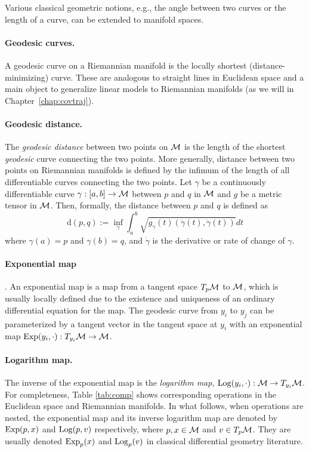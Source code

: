 Various classical geometric notions, e.g., the angle between two curves 
or the length of a curve, can be extended to manifold spaces.

\paragraph{Geodesic curves.} A geodesic curve on a Riemannian manifold is the locally shortest (distance-minimizing) curve.
These are analogous to straight lines in Euclidean space 
and a main object to generalize linear models to Riemannian manifolds (as we will in Chapter~\ref{chap:covtraj}).

\paragraph{Geodesic distance.} The \textit{geodesic distance}
between two points on $\mathcal{M}$ is the length of the shortest {\em geodesic} curve connecting the two points. More generally, distance between two points on Riemannian manifolds is defined by the infimum of the length of all differentiable curves connecting the two points. Let $\gamma$ be a continuously differentiable curve $\gamma:[a,b] \rightarrow \mathcal{M}$ between $p$ and $q$ in $\mathcal{M}$ and $g$ be a metric tensor in $\mathcal{M}$.
Then, formally, the distance between $p$ and $q$ is defined as
\begin{equation}
\text{d}(p,q) := \inf_\gamma \int_a^b \sqrt{g_\gamma(t) (\dot{\gamma}(t), \dot{\gamma}(t))} dt
\end{equation}
where $\gamma(a)=p$ and $\gamma(b)=q$, and $\dot{\gamma}$ is the derivative or rate of change of $\gamma$.

\paragraph{Exponential map}. An exponential map is a map from a tangent space $T_p\mathcal{M}$  to $\mathcal{M}$, which is usually locally defined due to the existence and uniqueness of an ordinary differential equation for the map.
The geodesic curve from $y_i$ to $y_j$ can be parameterized by a tangent vector in the tangent space at $y_i$ with an exponential map $\operatorname*{Exp}(y_i,\cdot ): T_{y_i}\mathcal{M} \rightarrow \mathcal{M}$. 

\paragraph{Logarithm map.}
The inverse of the exponential map is the \textit{logarithm map}, $\operatorname*{Log}(y_i,\cdot):\mathcal{M} \rightarrow T_{y_i}\mathcal{M}$. 
For completeness, Table \ref{tab:comp} shows corresponding operations in the Euclidean space and Riemannian manifolds.
In what follows, when operations are nested, the exponential map and its inverse logarithm map are denoted by $\operatorname*{Exp}(p, x)$ and $\operatorname*{Log}(p, v)$ respectively, where $p, x \in \mathcal{M}$ and $v\in T_p\mathcal{M}$. They are usually denoted $\operatorname*{Exp}_p(x)$ and $\operatorname*{Log}_p(v)$ in classical differential geometry literature. 
 

